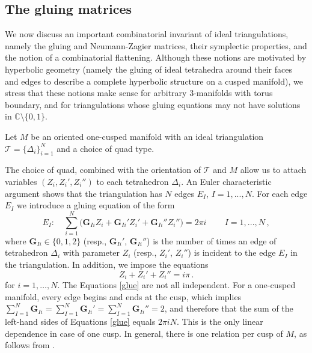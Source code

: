 \documentclass[12pt]{amsart}
\newcommand{\lbl}{\label}
\theoremstyle{definition}
\def\BC{\mathbb C}
\def\calT{\mathcal T}
\def\be{  \begin{equation} }
\def\ee{  \end{equation} }
\newcommand{\CT}{\mathcal{T}}
\newcommand{\cf}{\emph{cf.}}
\newcommand{\mb}{\mathbf}
\numberwithin{equation}{section}
\begin{document}

\subsection{The gluing matrices}
\lbl{sec.glue}

We now discuss an important combinatorial invariant of ideal triangulations,
namely the gluing and Neumann-Zagier matrices, their symplectic
properties, and the notion of a combinatorial flattening. Although these
notions are motivated by hyperbolic geometry (namely the gluing of ideal
tetrahedra around their faces and edges to describe a complete hyperbolic
structure on a cusped manifold), we stress that these notions make sense
for arbitrary 3-manifolds with torus boundary, and for triangulations 
whose gluing equations may not have solutions in $\BC\setminus\{0,1\}$.

Let $M$ be an oriented one-cusped manifold with an ideal 
triangulation $\calT=\{\Delta_i\}_{i=1}^N$ and a choice of 
quad type. 

The choice of quad, combined with the orientation of $\CT$ and $M$ allow us
to attach variables $(Z_i,Z_i',Z_i'')$ to each tetrahedron $\Delta_i$.
An Euler characteristic argument shows that the triangulation has 
$N$ edges $E_I$, $I=1,...,N$. For each edge $E_I$ we introduce a gluing 
equation of the form
%
\be E_I:\quad \sum_{i=1}^N \big(\mb{G}_{Ii}Z_i+\mb{G}_{Ii}'Z_i'
+\mb{G}_{Ii}''Z_i''\big) = 2\pi i\,\qquad I=1,...,N\,, \lbl{glue} \ee
%
where $\mb{G}_{Ii} \in \{0,1,2\}$ (resp., $\mb{G}_{Ii}'$, $\mb{G}_{Ii}''$) is 
the number of times an edge of tetrahedron $\Delta_i$ with parameter $Z_i$ 
(resp., $Z_i'$, $Z_i''$) is incident to the edge $E_I$ in the triangulation. 
In addition, we impose the equations
\be 
Z_i + Z_i'+Z_i''=i\pi \label{tetP}\,.
\ee
for $i=1,\dots,N$. The Equations \eqref{glue} are not all independent. 
For a one-cusped 
manifold, every edge begins and ends at the cusp, which implies 
$\sum_{I=1}^N \mb G_{Ii}=\sum_{I=1}^N \mb G_{Ii}'=\sum_{I=1}^N \mb G_{Ii}''=2$, and 
therefore that the sum of the left-hand sides of Equations \eqref{glue} 
equals $2\pi i N$. This is the only linear dependence in case of
one cusp. In general, there is one relation per cusp of $M$, 
as follows from \cite[Thm.4.1]{Neumann-combi}.
\end{document}
